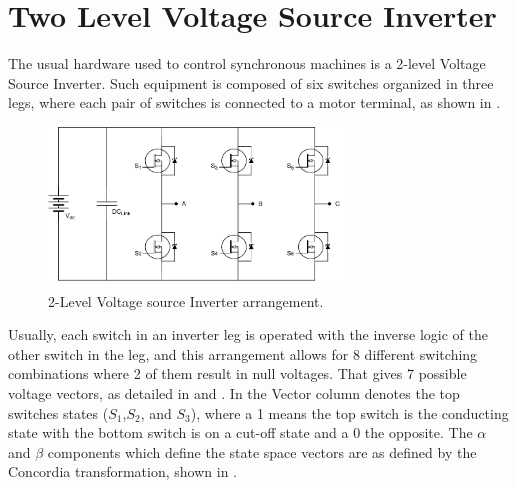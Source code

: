 
\vfill
\section{Two Level Voltage Source Inverter}
\label{section:Two Level Voltage Source Inverter}%
The usual hardware used to control synchronous machines is a 2-level Voltage Source Inverter. Such equipment is composed of six switches organized in three legs, where each pair of switches is connected to a motor terminal, as shown in .

\begin{figure}[!htb]
	\centering
	\includegraphics[width=0.7\textwidth]{Figures/Inverter.pdf}
	\caption[2-Level Voltage source Inverter arrangement.]{2-Level Voltage source Inverter arrangement.}
	\label{fig:inverter_and_motor_schematic}%
\end{figure}

Usually, each switch in an inverter leg is operated with the inverse logic of the other switch in the leg, and this arrangement allows for 8 different switching combinations where 2 of them result in null voltages. That gives 7 possible voltage vectors, as detailed in  and . In  the Vector column denotes the top switches states ($S_1$,$S_2$, and $S_3$), where a 1 means the top switch is the conducting state with the bottom switch is on a cut-off state and a 0 the opposite. The $\alpha$ and $\beta$ components which define the state space vectors are as defined by the Concordia transformation, shown in .


